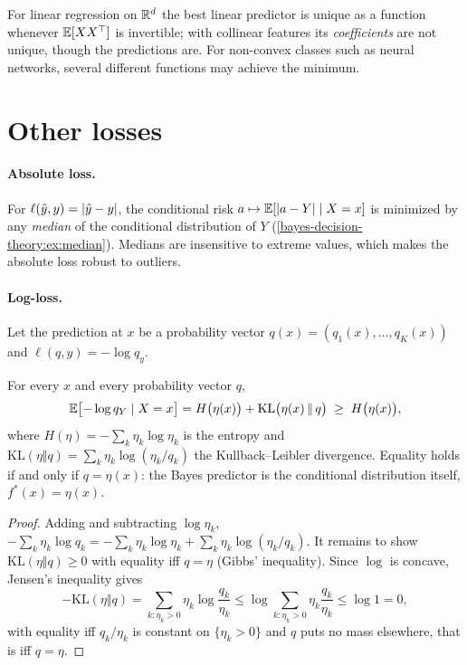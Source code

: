 \begin{notechapter}
For linear regression on $\mathbb{R}^d$ the best linear predictor is unique as a
function whenever $\mathbb{E}[XX^\top]$ is invertible; with collinear features its
\emph{coefficients} are not unique, though the predictions are. For
non-convex classes such as neural networks, several different functions may
achieve the minimum.

\section{Other losses}\label{bayes-decision-theory:sec:other}

\paragraph{Absolute loss.} For $\ell(\hat y, y) = \left|\hat y - y\right|$, the
conditional risk $a \mapsto \mathbb{E}[\left|a - Y\right|\mid X=x]$ is minimized by any
\emph{median} of the conditional distribution of $Y$ (\cref{bayes-decision-theory:ex:median}).
Medians are insensitive to extreme values, which makes the absolute loss
robust to outliers.

\paragraph{Log-loss.} Let the prediction at $x$ be a probability vector
$q(x) = (q_1(x), \dots, q_K(x))$ and $\ell(q, y) = -\log q_y$.

\begin{proposition}\label{bayes-decision-theory:prop:logloss}
For every $x$ and every probability vector $q$,
\[
  \mathbb{E}\bigl[-\log q_Y \mid X = x\bigr]
  = H\bigl(\eta(x)\bigr) + \mathrm{KL}\bigl(\eta(x)\,\Vert\, q\bigr)
  \;\geq\; H\bigl(\eta(x)\bigr),
\]
where $H(\eta) = -\sum_k \eta_k \log \eta_k$ is the entropy and
$\mathrm{KL}(\eta\Vert q) = \sum_k \eta_k \log(\eta_k/q_k)$ the Kullback--Leibler
divergence. Equality holds if and only if $q = \eta(x)$: the Bayes predictor
is the conditional distribution itself, $f^*(x) = \eta(x)$.
\end{proposition}

\begin{proof}
Adding and subtracting $\log \eta_k$,
$-\sum_k \eta_k \log q_k = -\sum_k \eta_k \log \eta_k + \sum_k \eta_k \log(\eta_k / q_k)$.
It remains to show $\mathrm{KL}(\eta\Vert q)\geq 0$ with equality iff $q=\eta$
(Gibbs' inequality). Since $\log$ is concave, Jensen's inequality gives
\[
  -\mathrm{KL}(\eta\Vert q) = \sum_{k:\eta_k>0} \eta_k \log\frac{q_k}{\eta_k}
  \leq \log \sum_{k:\eta_k>0} \eta_k \frac{q_k}{\eta_k}
  \leq \log 1 = 0,
\]
with equality iff $q_k/\eta_k$ is constant on $\{\eta_k > 0\}$ and
$q$ puts no mass elsewhere, that is iff $q = \eta$.
\end{proof}


\end{notechapter}
